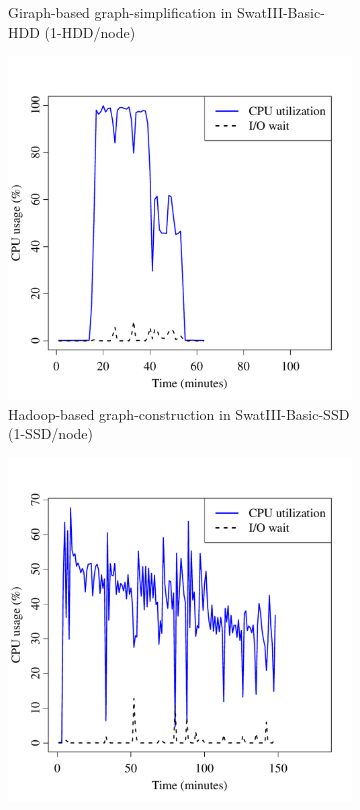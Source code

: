 \documentclass[conference]{IEEEtran}
\begin{document}
\begin{figure}[htb]
\begin{subfigure}[b]{0.23\textwidth}
                \caption{Giraph-based graph-simplification in SwatIII-Basic-HDD (1-HDD/node)}
                \label{fig:ECCPUHDD}
        \end{subfigure}       
        \begin{subfigure}[b]{0.23\textwidth}
                \includegraphics[width=\textwidth]{Figure/SystemData/Plots/BGCPUSSD.pdf}
                \caption{Hadoop-based graph-construction in SwatIII-Basic-SSD (1-SSD/node)}
                \label{fig:BGCPUSSD}
        \end{subfigure}    
        \begin{subfigure}[b]{0.23\textwidth}
                \includegraphics[width=\textwidth]{Figure/SystemData/Plots/ECCPUSSD.pdf}

\end{subfigure}
\end{figure}
\end{document}
